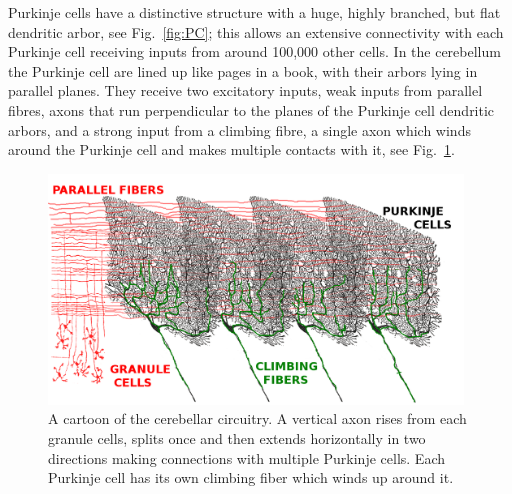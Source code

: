 \documentclass[12pt]{article}
\begin{document}
Purkinje cells have a distinctive structure with a huge, highly
branched, but flat dendritic arbor, see Fig.~\ref{fig:PC}; this allows
an extensive connectivity with each Purkinje cell receiving inputs
from around 100,000 other cells. In the cerebellum the Purkinje cell
are lined up like pages in a book, with their arbors lying in parallel
planes. They receive two excitatory inputs, weak inputs from parallel
fibres, axons that run perpendicular to the planes of the Purkinje
cell dendritic arbors, and a strong input from a climbing fibre, a
single axon which winds around the Purkinje cell and makes multiple
contacts with it, see Fig.~\ref{fig:cerebellum}.

\begin{figure}
\begin{center}
\includegraphics[width=11cm]{cerebellum.png}
\end{center}
\caption{A cartoon of the cerebellar circuitry. A vertical axon rises
  from each granule cells, splits once and then extends horizontally
  in two directions making connections with multiple Purkinje
  cells. Each Purkinje cell has its own climbing fiber which winds up
  around it.\label{fig:cerebellum}}
\end{figure}
\end{document}
